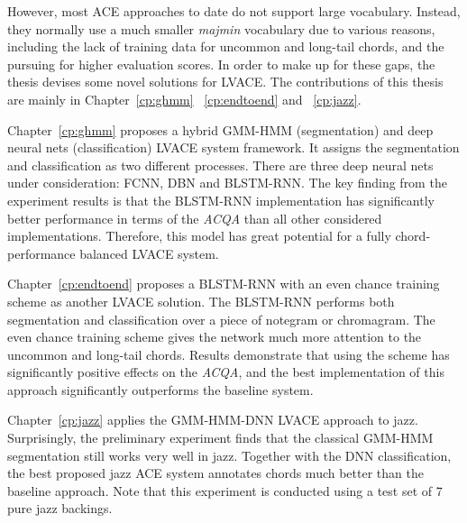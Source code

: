 However, most ACE approaches to date do not support large vocabulary. Instead, they normally use a much smaller \textit{majmin} vocabulary due to various reasons, including the lack of training data for uncommon and long-tail chords, and the pursuing for higher evaluation scores. In order to make up for these gaps, the thesis devises some novel solutions for LVACE. The contributions of this thesis are mainly in Chapter~\ref{cp:ghmm} ~\ref{cp:endtoend} and ~\ref{cp:jazz}.

Chapter~\ref{cp:ghmm} proposes a hybrid GMM-HMM (segmentation) and deep neural nets (classification) LVACE system framework. It assigns the segmentation and classification as two different processes. There are three deep neural nets under consideration: FCNN, DBN and BLSTM-RNN. The key finding from the experiment results is that the BLSTM-RNN implementation has significantly better performance in terms of the \textit{ACQA} than all other considered implementations. Therefore, this model has great potential for a fully chord-performance balanced LVACE system.

Chapter~\ref{cp:endtoend} proposes a BLSTM-RNN with an even chance training scheme as another LVACE solution. The BLSTM-RNN performs both segmentation and classification over a piece of notegram or chromagram. The even chance training scheme gives the network much more attention to the uncommon and long-tail chords. Results demonstrate that using the scheme has significantly positive effects on the \textit{ACQA}, and the best implementation of this approach significantly outperforms the baseline system.

Chapter~\ref{cp:jazz} applies the GMM-HMM-DNN LVACE approach to jazz. Surprisingly, the preliminary experiment finds that the classical GMM-HMM segmentation still works very well in jazz. Together with the DNN classification, the best proposed jazz ACE system annotates chords much better than the baseline approach. Note that this experiment is conducted using a test set of 7 pure jazz backings.


